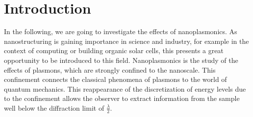 

\chapter{Introduction}
\label{chap:einleitung}

In the following, we are going to investigate the effects of nanoplasmonics. As nanostructuring is gaining importance in science and industry, for example in the context of computing or building organic solar cells, this presents a great opportunity to be introduced to this field. Nanoplasmonics is the study of the effects of plasmons, which are strongly confined to the nanoscale. This confinement connects the classical phenomena of plasmons to the world of quantum mechanics. This reappearance of the discretization of energy levels due to the confinement allows the observer to extract information from the sample well below the diffraction limit of $\frac{\lambda}{2}$. 
